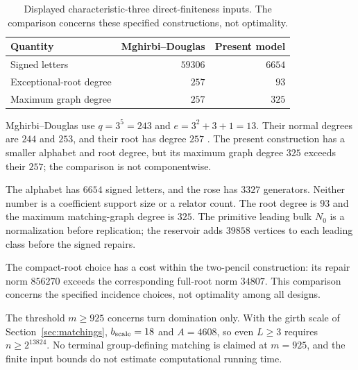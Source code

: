 \begin{table}[htbp]
\centering
\caption{Displayed characteristic-three direct-finiteness inputs. The comparison concerns these specified constructions, not optimality.}\label{tab:char3-comparison}
\begin{tabular}{lrr}
\toprule
Quantity & Mghirbi--Douglas \cite{MD26} & Present model\\
\midrule
Signed letters & $59306$ & $6654$\\
Exceptional-root degree & $257$ & $93$\\
Maximum graph degree & $257$ & $325$\\
\bottomrule
\end{tabular}
\end{table}

Mghirbi--Douglas use $q=3^5=243$ and $e=3^2+3+1=13$. Their normal degrees are $244$ and $253$, and their root has degree $257$ \cite[Definition~7.1, Lemma~7.2, and Section~7.4]{MD26}. The present construction has a smaller alphabet and root degree, but its maximum graph degree $325$ exceeds their $257$; the comparison is not componentwise.

\begin{remark}\label{rem:char3-interpretation}
The alphabet has $6654$ signed letters, and the rose has $3327$ generators. Neither number is a coefficient support size or a relator count. The root degree is $93$ and the maximum matching-graph degree is $325$. The primitive leading bulk $N_0$ is a normalization before replication; the reservoir adds $39858$ vertices to each leading class before the signed repairs.

The compact-root choice has a cost within the two-pencil construction: its repair norm $856270$ exceeds the corresponding full-root norm $34807$. This comparison concerns the specified incidence choices, not optimality among all designs.

The threshold $m\ge925$ concerns turn domination only. With the girth scale of Section~\ref{sec:matchings}, $b_{\rm scale}=18$ and $A=4608$, so even $L\ge3$ requires $n\ge2^{13824}$. No terminal group-defining matching is claimed at $m=925$, and the finite input bounds do not estimate computational running time.
\end{remark}
